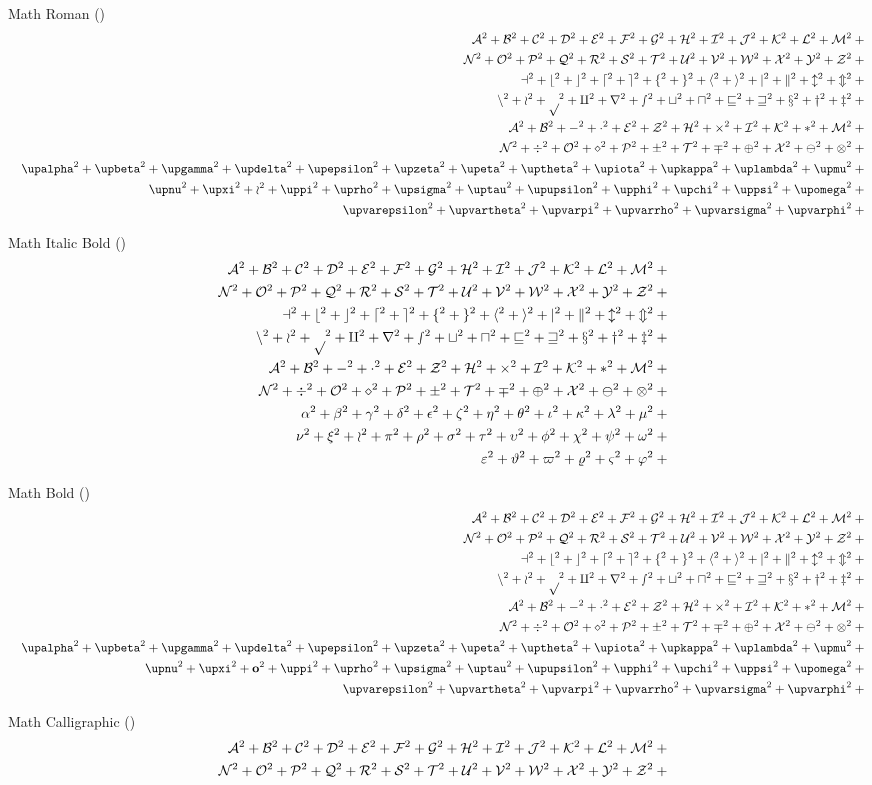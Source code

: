 	Math Roman (\texttt{\string\mathrm})
	\def\test#1{\mathrm{#1}^{2}+{}}%
	\begin{eqnarray*}
	  && {\testupperi}\\
	  && {\testupperii}\\
	  && {\testloweri}\\
	  && {\testlowerii}\\
	  && {\testupgreeki}\\
	  && {\testupgreekii}\\
	  && {\testlowgreekupi}\\
	  && {\testlowgreekupii}\\
	  && {\testlowgreekupiii}
	\end{eqnarray*}%

	Math Italic Bold (\texttt{\string\bm})
	\def\test#1{\bm{#1}^{2}+{}}%
	\begin{eqnarray*}
	  && {\testupperi}\\
	  && {\testupperii}\\
	  && {\testloweri}\\
	  && {\testlowerii}\\
	  && {\testupgreeki}\\
	  && {\testupgreekii}\\
	  && {\testlowgreeki}\\
	  && {\testlowgreekii}\\
	  && {\testlowgreekiii}
	\end{eqnarray*}%

	Math Bold (\texttt{\string\mathbf})
	\def\test#1{\mathbf{#1}^{2}+{}}%
	\begin{eqnarray*}
	  && {\testupperi}\\
	  && {\testupperii}\\
	  && {\testloweri}\\
	  && {\testlowerii}\\
	  && {\testupgreeki}\\
	  && {\testupgreekii}\\
	  && {\def\test#1{\bm{\mathbf{#1}}^{2}+{}}\testlowgreekupi}\\
	  && {\def\test#1{\bm{\mathbf{#1}}^{2}+{}}\testlowgreekupii}\\
	  && {\def\test#1{\bm{\mathbf{#1}}^{2}+{}}\testlowgreekupiii}
	\end{eqnarray*}

	Math Calligraphic (\texttt{\string\mathcal})
	\def\test#1{\mathcal{#1}^{2}+{}}%
	\begin{eqnarray*}
	  && {\testupperi}\\
	  && {\testupperii}
	\end{eqnarray*}%

